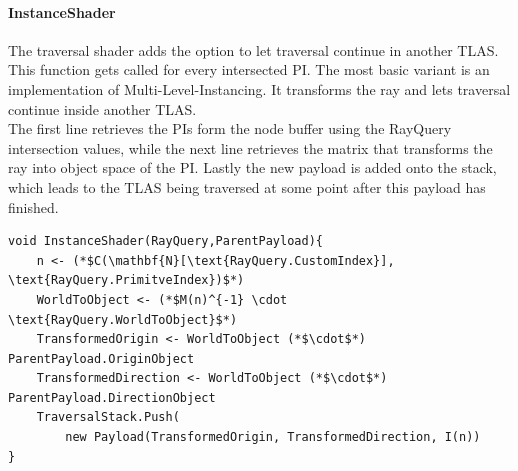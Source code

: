 \paragraph{InstanceShader}
\label{sec:InstanceShader}
The traversal shader adds the option to let traversal continue in another TLAS. This function gets called for every intersected PI. The most basic variant is an implementation of Multi-Level-Instancing. It transforms the ray and lets traversal continue inside another TLAS.\\
The first line retrieves the PIs form the node buffer using the RayQuery intersection values, while the next line retrieves the matrix that transforms the ray into object space of the PI.
Lastly the new payload is added onto the stack, which leads to the TLAS being traversed at some point after this payload has finished.
\begin{lstlisting}
void InstanceShader(RayQuery,ParentPayload){
    n <- (*$C(\mathbf{N}[\text{RayQuery.CustomIndex}], \text{RayQuery.PrimitveIndex})$*)
    WorldToObject <- (*$M(n)^{-1} \cdot \text{RayQuery.WorldToObject}$*)
    TransformedOrigin <- WorldToObject (*$\cdot$*) ParentPayload.OriginObject
    TransformedDirection <- WorldToObject (*$\cdot$*) ParentPayload.DirectionObject
    TraversalStack.Push(
        new Payload(TransformedOrigin, TransformedDirection, I(n))
}
\end{lstlisting}
\newpage
